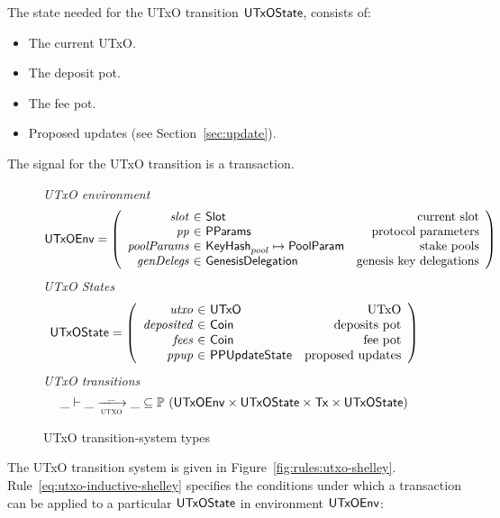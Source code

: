 The state needed for the UTxO transition $\mathsf{UTxOState}$, consists of:

\begin{itemize}
  \item The current UTxO.
  \item The deposit pot.
  \item The fee pot.
  \item Proposed updates (see Section~\ref{sec:update}).
\end{itemize}
The signal for the UTxO transition is a transaction.

\begin{figure}[htb]
  \emph{UTxO environment}
  \begin{equation*}
    \UTxOEnv =
    \left(
      \begin{array}{r@{~\in~}lr}
        \var{slot} & \Slot & \text{current slot}\\
        \var{pp} & \PParams & \text{protocol parameters}\\
        \var{poolParams} & \KeyHash_{pool}\mapsto\PoolParam & \text{stake pools}\\
        \var{genDelegs} & \GenesisDelegation & \text{genesis key delegations} \\
      \end{array}
    \right)
  \end{equation*}
  \emph{UTxO States}
  \begin{equation*}
    \UTxOState =
    \left(
      \begin{array}{r@{~\in~}lr}
        \var{utxo} & \UTxO & \text{UTxO}\\
        \var{deposited} & \Coin & \text{deposits pot}\\
        \var{fees} & \Coin & \text{fee pot}\\
        \var{ppup} & \PPUpdateState & \text{proposed updates}\\
      \end{array}
    \right)
  \end{equation*}
  \emph{UTxO transitions}
  \begin{equation*}
    \_ \vdash
    \var{\_} \trans{utxo}{\_} \var{\_}
    \subseteq \powerset (\UTxOEnv \times \UTxOState \times \Tx \times \UTxOState)
  \end{equation*}
  \caption{UTxO transition-system types}
  \label{fig:ts-types:utxo-shelley}
\end{figure}

The UTxO transition system is given in Figure~\ref{fig:rules:utxo-shelley}.
Rule~\ref{eq:utxo-inductive-shelley} specifies the conditions under which a transaction can
be applied to a particular $\mathsf{UTxOState}$ in environment $\mathsf{UTxOEnv}$:

